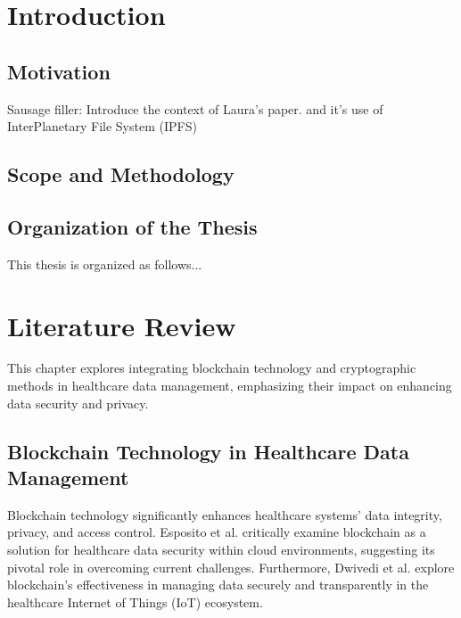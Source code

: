\documentclass[cic,tc,english]{iiufrgs}
\begin{document}

\tableofcontents

\chapter{Introduction}

\section{Motivation}
Sausage filler: Introduce the context of Laura's paper. \cite{laura2023} and it's use of InterPlanetary File System (IPFS) \cite{benet2013ipfs}

\section{Scope and Methodology}


\section{Organization of the Thesis}
This thesis is organized as follows...


\chapter{Literature Review}

This chapter explores integrating blockchain technology and cryptographic methods in healthcare data management, emphasizing their impact on enhancing data security and privacy.

\section{Blockchain Technology in Healthcare Data Management}
Blockchain technology significantly enhances healthcare systems' data integrity, privacy, and access control. Esposito et al. \cite{Esposito2018} critically examine blockchain as a solution for healthcare data security within cloud environments, suggesting its pivotal role in overcoming current challenges. Furthermore, Dwivedi et al. \cite{Dwivedi2019} explore blockchain's effectiveness in managing data securely and transparently in the healthcare Internet of Things (IoT) ecosystem.
\end{document}
